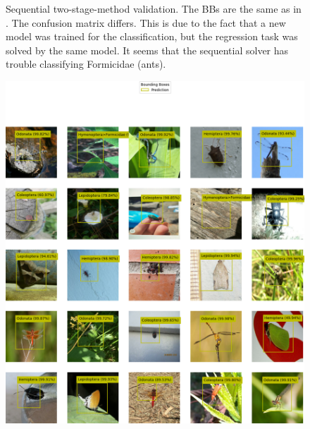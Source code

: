 \begin{figure}
\begin{multicols}{2}
\begin{minipage}{.45\textwidth}
        \end{minipage}
    \end{multicols}
    \caption{Sequential two-stage-method validation. The BBs are the same as in . The confusion matrix differs. This is due to the fact that a new model was trained for the classification, but the regression task was solved by the same model. It seems that the sequential solver has trouble classifying Formicidae (ants).}
    \label{fig:sequential-results}
\end{figure}

\begin{figure}
    \centering
    \begin{multicols}{2}
        \begin{minipage}{.45\textwidth}
            \includegraphics[width=\textwidth]{images/two-in-one-model-predictions.png}
        \end{minipage}
        \columnbreak
        \begin{minipage}{.45\textwidth}

\end{minipage}
\end{multicols}
\end{figure}

